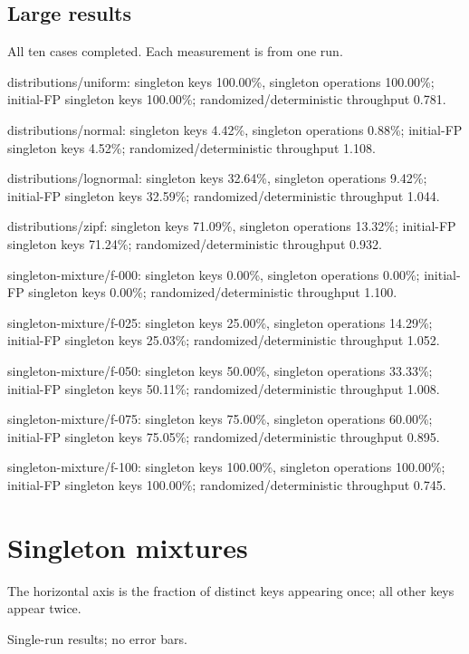 \subsection*{Large results}
All ten cases completed. Each measurement is from one run.\par
distributions/uniform: singleton keys 100.00\%, singleton operations 100.00\%; initial-FP singleton keys 100.00\%; randomized/deterministic throughput 0.781.\par
distributions/normal: singleton keys 4.42\%, singleton operations 0.88\%; initial-FP singleton keys 4.52\%; randomized/deterministic throughput 1.108.\par
distributions/lognormal: singleton keys 32.64\%, singleton operations 9.42\%; initial-FP singleton keys 32.59\%; randomized/deterministic throughput 1.044.\par
distributions/zipf: singleton keys 71.09\%, singleton operations 13.32\%; initial-FP singleton keys 71.24\%; randomized/deterministic throughput 0.932.\par
singleton-mixture/f-000: singleton keys 0.00\%, singleton operations 0.00\%; initial-FP singleton keys 0.00\%; randomized/deterministic throughput 1.100.\par
singleton-mixture/f-025: singleton keys 25.00\%, singleton operations 14.29\%; initial-FP singleton keys 25.03\%; randomized/deterministic throughput 1.052.\par
singleton-mixture/f-050: singleton keys 50.00\%, singleton operations 33.33\%; initial-FP singleton keys 50.11\%; randomized/deterministic throughput 1.008.\par
singleton-mixture/f-075: singleton keys 75.00\%, singleton operations 60.00\%; initial-FP singleton keys 75.05\%; randomized/deterministic throughput 0.895.\par
singleton-mixture/f-100: singleton keys 100.00\%, singleton operations 100.00\%; initial-FP singleton keys 100.00\%; randomized/deterministic throughput 0.745.\par
\clearpage
\section{Singleton mixtures}
The horizontal axis is the fraction of distinct keys appearing once; all other keys appear twice.

\begin{center}\small Single-run results; no error bars.\end{center}
\clearpage
